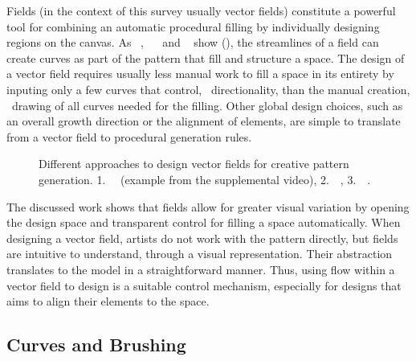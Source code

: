 Fields (in the context of this survey usually vector fields) constitute a powerful tool for combining an automatic procedural filling by individually designing regions on the canvas. As \citeauthor*{hsu_2020_aef}~\cite{hsu_2020_aef}, ~\citeauthor*{saputra_2017_ffo}~\cite{saputra_2017_ffo} and \citeauthor*{gieseke_2017_ooo}~\cite{gieseke_2017_ooo} show (), the streamlines of a field can create curves as part of the pattern that fill and structure a space. The design of a vector field requires usually less manual work to fill a space in its entirety by inputing only a few curves that control, \eg~directionality, than the manual creation, \eg~drawing of all curves needed for the filling. Other global design choices, such as an overall growth direction or the alignment of elements, are simple to translate from a vector field to procedural generation rules.

\begin{figure}
    \centering
    \caption{\label{fig:fields}Different approaches to design vector fields for creative pattern generation. 1.~\citeauthor*{gieseke_2017_ooo}~\cite{gieseke_2017_ooo} (example from the supplemental video), 2.~\citeauthor*{hsu_2020_aef}~\cite{hsu_2020_aef}, 3.~\citeauthor*{saputra_2017_ffo}~\cite{saputra_2017_ffo}.}
\end{figure}

The discussed work shows that fields allow for greater visual variation by opening the design space and transparent control for filling a space automatically. When designing a vector field, artists do not work with the pattern directly, but fields are intuitive to understand, \eg through a visual representation. Their abstraction translates to the model in a straightforward manner. Thus, using flow within a vector field to design is a suitable control mechanism, especially for designs that aims to align their elements to the space.


\subsection{Curves and Brushing}
\label{subsubsec:analysis_creative_means_curves}

